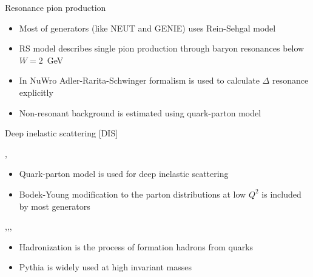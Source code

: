 \begin{slide}[toc=RES pion production]{Resonance pion production}
\null\vfill

  \twocolumn
  {
    \begin{itemize}
      \item Most of generators (like NEUT and GENIE) uses Rein-Sehgal model
      \item RS model describes single pion production through baryon resonances below $W = 2$~GeV
    \end{itemize}
  }
  {
    \centering\scalebox{0.75}{}
  }	

  \begin{itemize}
    \item In NuWro Adler-Rarita-Schwinger formalism is used to calculate $\Delta$ resonance explicitly
    \item Non-resonant background is estimated using quark-parton model
  \end{itemize}

\vfill\null
\end{slide}


\begin{slide}[toc=Deep Inelastic Scattering]{Deep inelastic scattering [DIS]}
\null\vfill

  \twocolumn
  {
    \sep
    \begin{itemize}
     \item Quark-parton model is used for deep inelastic scattering
     \item Bodek-Young modification to the parton distributions at low $Q^2$ is included by most generators
    \end{itemize}
  }
  {
    \scalebox{0.75}{}
  }
  
  
  \twocolumn
  {
    \sep\sep\sep
    \centering\scalebox{0.75}{}
  }
  {
    \begin{itemize}
     \item Hadronization is the process of formation hadrons from quarks
     \item Pythia is widely used at high invariant masses
    \end{itemize}
  }

\vfill\null
\end{slide}


